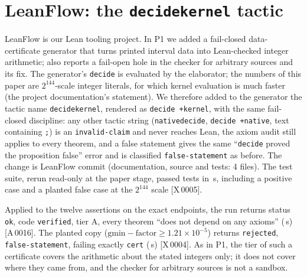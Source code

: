 \documentclass[10pt]{article}
\newcommand{\tg}[2]{\texorpdfstring{\textsf{[#1\,#2]}}{}}  %
\newcommand{\lean}[1]{\texttt{#1}}
\newcommand{\hash}[1]{\texttt{\expandafter\seqsplit\expandafter{#1}}}
\renewcommand{\_}{\textunderscore\allowbreak}
\begin{document}
\section{LeanFlow: the \lean{decide\_kernel} tactic}\label{sec:lf}
LeanFlow is our Lean tooling project. In P1 we added a fail-closed data-certificate generator that turns printed interval data into Lean-checked integer arithmetic; \cite{p1} also reports a fail-open hole in the checker for arbitrary sources and its fix. The generator's \lean{decide} is evaluated by the elaborator; the numbers of this paper are $2^{144}$-scale integer literals, for which kernel evaluation is much faster (the project documentation's statement). We therefore added to the generator the tactic name \texttt{decide\_kernel}, rendered as \lean{decide +kernel}, with the same fail-closed discipline: any other tactic string (\lean{native\_decide}, \lean{decide +native}, text containing \texttt{;}) is an \texttt{invalid-claim} and never reaches Lean, the axiom audit still applies to every theorem, and a false statement gives the same ``\lean{decide} proved the proposition false'' error and is classified \texttt{false-statement} as before. The change is LeanFlow commit \hash{\PTLeanCommit} (documentation, source and tests: 4 files). The test suite, rerun read-only at the paper stage, passed \PTLFTests{} tests in \PTLFTestSec\,s, including a positive case and a planted false case at the $2^{144}$ scale \tg{X}{0005}.

Applied to the twelve assertions on the exact endpoints, the run returns status \texttt{ok}, code \texttt{verified}, tier A, every theorem ``does not depend on any axioms'' (\PTLFSecExact\,s) \tg{A}{0016}. The planted copy ($\text{gmin}-\text{factor}\ge1.21\times10^{-5}$) returns \texttt{rejected}, \texttt{false-statement}, failing exactly \lean{cert\_5} (\PTLFSecPlanted\,s) \tg{X}{0004}. As in P1, the tier of such a certificate covers the arithmetic about the stated integers only; it does not cover where they came from, and the checker for arbitrary sources is not a sandbox.
\end{document}
